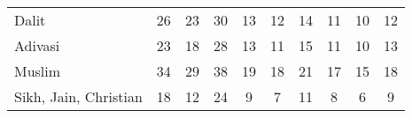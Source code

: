 \begin{tabular}{l*{9}{c}}
Dalit               &          26&          23&          30&          13&          12&          14&          11&          10&          12\\
Adivasi             &          23&          18&          28&          13&          11&          15&          11&          10&          13\\
Muslim              &          34&          29&          38&          19&          18&          21&          17&          15&          18\\
Sikh, Jain, Christian&          18&          12&          24&           9&           7&          11&           8&           6&           9\\
\bottomrule
\end{tabular}
